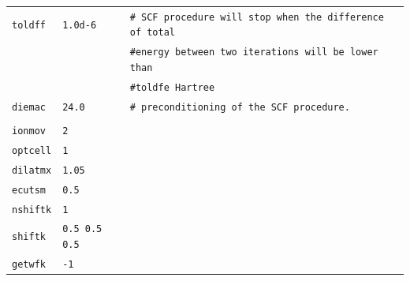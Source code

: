 \documentclass[11pt,a4paper]{article}
\begin{document}
\begin{center}
\begin{tabular}{lll}
\texttt{toldff} & \texttt{1.0d-6} &\texttt{\# SCF procedure will stop when the difference of total}\\
&&\texttt{\#\space\space\space\space energy between two iterations will be lower than}\\
&&\texttt{\#\space\space\space\space toldfe Hartree}\\
\texttt{diemac} &\texttt{24.0} & \texttt{\# preconditioning of the SCF procedure.}\\
&&\\
\texttt{ionmov} & \texttt{2} &\\
\texttt{optcell} &\texttt{1}&\\
\texttt{dilatmx} &\texttt{1.05}&\\
\texttt{ecutsm} &\texttt{0.5}&\\
\texttt{nshiftk}&\texttt{1}&\\
\texttt{shiftk}&\texttt{0.5 0.5 0.5}&\\
\texttt{getwfk}&\texttt{-1}&\\
\end{tabular}
\end{center} 
\newpage
\end{document}
